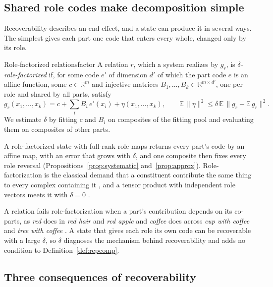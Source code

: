 \documentclass[10pt]{article}
\theoremstyle{plain}
\theoremstyle{remark}
\newcommand{\R}{\mathbb{R}}
\begin{document}
\subsection{Shared role codes make decomposition simple}
\label{sec:mechanics}

Recoverability describes an end effect, and a state can produce it in several ways. The simplest gives each part one code that enters every whole, changed only by its role.

\begin{defbox}{Role-factorized relations}{factor}
A relation $r$, which a system realizes by $g_r$, is \emph{$\delta$-role-factorized} if, for some code $e'$ of dimension $d'$ of which the part code $e$ is an affine function, some $c \in \R^m$ and injective matrices $B_1, \ldots, B_k \in \R^{m \times d'}$, one per role and shared by all parts, satisfy
\begin{equation}
  g_r(x_1, \ldots, x_k) = c + \textstyle\sum_{i} B_i\, e'(x_i) + \eta(x_1, \ldots, x_k), \qquad \mathbb{E}\,\lVert \eta \rVert^2 \le \delta\, \mathbb{E}\,\lVert g_r - \mathbb{E}\,g_r \rVert^2 .
  \label{eq:factor}
\end{equation}
We estimate $\delta$ by fitting $c$ and $B_i$ on composites of the fitting pool and evaluating them on composites of other parts.
\end{defbox}

A role-factorized state with full-rank role maps returns every part's code by an affine map, with an error that grows with $\delta$, and one composite then fixes every role reversal (Propositions~\ref{prop:systematic} and~\ref{prop:approx}). Role-factorization is the classical demand that a constituent contribute the same thing to every complex containing it \citep{fodor1988}, and a tensor product with independent role vectors meets it with $\delta = 0$ \citep{smolensky1990}.

A relation fails role-factorization when a part's contribution depends on its co-parts, as \emph{red} does in \emph{red hair} and \emph{red apple} \citep{kamp1995} and \emph{coffee} does across \emph{cup with coffee} and \emph{tree with coffee} \citep{smolensky1988}. A state that gives each role its own code can be recoverable with a large $\delta$, so $\delta$ diagnoses the mechanism behind recoverability and adds no condition to Definition~\ref{def:repcomp}.

\subsection{Three consequences of recoverability}
\label{sec:consequences}
\end{document}
